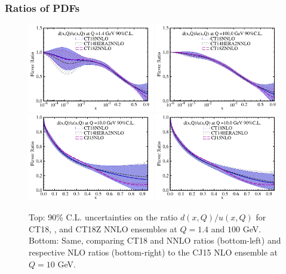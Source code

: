 \subsubsection{Ratios of PDFs}
\begin{figure}[t]
	\center
	\includegraphics[width=0.49\textwidth]{./fig/du_1p4_CT18.pdf}
	\includegraphics[width=0.49\textwidth]{./fig/du_100_CT18.pdf}
	\includegraphics[width=0.49\textwidth]{./fig/pdfs_CT18NNLO_CT14HERA2NNLO_CJ15nlo__10_0GeV_A90CL__10___dou__pdf__lin-lin_ect.pdf}
	\includegraphics[width=0.49\textwidth]{./fig/pdfs_CT18NLO_CT14HERA2NLO_CJ15nlo__10_0GeV_A90CL__10___dou__pdf__lin-lin_ect.pdf}

	\caption{Top: 90\% C.L. uncertainties on the ratio
		$d(x,Q)/u(x,Q)$ for CT18, \CTHERAII, and CT18Z NNLO ensembles at $Q=1.4$ and $100$ GeV. Bottom: Same, comparing CT18 and \CTHERAII  NNLO ratios (bottom-left) and respective NLO ratios (bottom-right) to the CJ15 NLO ensemble
		at $Q=10$ GeV.
		\label{fig:DOUband}}
\end{figure}

